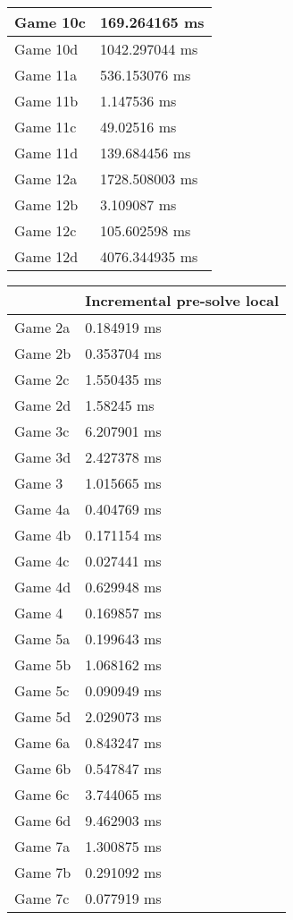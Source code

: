 \begin{tabular}{|l|l|}
	Game 10c & 169.264165 ms \\ \hline
	Game 10d & 1042.297044 ms \\ \hline
	Game 11a & 536.153076 ms \\ \hline
	Game 11b & 1.147536 ms \\ \hline
	Game 11c & 49.02516 ms \\ \hline
	Game 11d & 139.684456 ms \\ \hline
	Game 12a & 1728.508003 ms \\ \hline
	Game 12b & 3.109087 ms \\ \hline
	Game 12c & 105.602598 ms \\ \hline
	Game 12d & 4076.344935 ms \\ \hline
\end{tabular}
\begin{tabular}{|l|l|}
	\hline
	& Incremental pre-solve local \\ \hline
	Game 2a & 0.184919 ms \\ \hline
	Game 2b & 0.353704 ms \\ \hline
	Game 2c & 1.550435 ms \\ \hline
	Game 2d & 1.58245 ms \\ \hline
	Game 3c & 6.207901 ms \\ \hline
	Game 3d & 2.427378 ms \\ \hline
	Game 3 & 1.015665 ms \\ \hline
	Game 4a & 0.404769 ms \\ \hline
	Game 4b & 0.171154 ms \\ \hline
	Game 4c & 0.027441 ms \\ \hline
	Game 4d & 0.629948 ms \\ \hline
	Game 4 & 0.169857 ms \\ \hline
	Game 5a & 0.199643 ms \\ \hline
	Game 5b & 1.068162 ms \\ \hline
	Game 5c & 0.090949 ms \\ \hline
	Game 5d & 2.029073 ms \\ \hline
	Game 6a & 0.843247 ms \\ \hline
	Game 6b & 0.547847 ms \\ \hline
	Game 6c & 3.744065 ms \\ \hline
	Game 6d & 9.462903 ms \\ \hline
	Game 7a & 1.300875 ms \\ \hline
	Game 7b & 0.291092 ms \\ \hline
	Game 7c & 0.077919 ms \\ \hline

\end{tabular}
